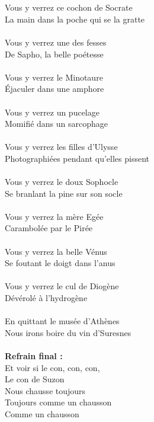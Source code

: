 \\\\Vous y verrez ce cochon de Socrate
\\La main dans la poche qui se la gratte
\\\\Vous y verrez une des fesses
\\De Sapho, la belle poétesse
\\\\Vous y verrez le Minotaure
\\Éjaculer dans une amphore
\\\\Vous y verrez un pucelage
\\Momifié dans un sarcophage
\\\\Vous y verrez les filles d'Ulysse
\\Photographiées pendant qu'elles pissent
\\\\Vous y verrez le doux Sophocle
\\Se branlant la pine sur son socle
\\\\Vous y verrez la mère Egée
\\Carambolée par le Pirée
\\\\Vous y verrez la belle Vénus
\\Se foutant le doigt dans l'anus
\\\\Vous y verrez le cul de Diogène
\\Dévérolé à l'hydrogène
\\\\En quittant le musée d'Athènes
\\Nous irons boire du vin d'Suresnes
\\\\\textbf{Refrain final :}
\\Et voir si le con, con, con,
\\Le con de Suzon
\\Nous chausse toujours
\\Toujours comme un chausson
\\Comme un chausson

\breakpage